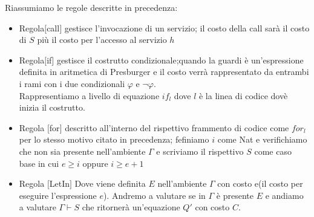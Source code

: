 \documentclass[../../main.tex]{subfiles}
\begin{document}
Riassumiamo le regole descritte in precedenza:\\
\begin{itemize}
    \item Regola$[$call$]$ gestisce l'invocazione di un servizio; il costo della call sarà il costo di $S$ più il costo per l'accesso al servizio $h$ 
    \item Regola$[$if$]$ gestisce il costrutto condizionale;quando la guardi è un'espressione definita in aritmetica di Presburger e il costo verrà rappresentato da entrambi i rami con i due condizionali $\varphi $ e $\neg \varphi$.\\Rappresentiamo a livello di equazione $if_l$ dove $l$ è la linea di codice dovè inizia il costrutto.
    \item Regola $[$for$]$ descritto all'interno del rispettivo frammento di codice come $for_l$ per lo stesso motivo citato in precedenza; fefiniamo $i$ come Nat e verifichiamo che non sia presente nell'ambiente $\varGamma$ e scriviamo il rispettivo $S$ come caso base in cui $e \geq i$ oppure $i \geq e + 1$
    \item Regola $[$LetIn$]$ Dove viene definita $E$ nell'ambiente $\varGamma$ con costo e(il costo per eseguire l'espressione $e$). Andremo a valutare se in $\varGamma$ è presente $E$ e andiamo a valutare $\varGamma \vdash S$ che ritornerà un'equazione $Q'$ con costo $C$.
\end{itemize}
\end{document}
